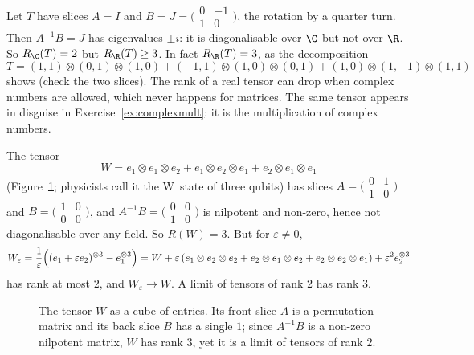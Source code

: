 \begin{example}\label{exa:rotation}
Let $T$ have slices $A=I$ and $B=J=\bigl(\begin{smallmatrix}0&-1\\1&0\end{smallmatrix}\bigr)$, the rotation by a quarter turn. Then
$A^{-1}B=J$ has eigenvalues $\pm i$: it is diagonalisable over $\C$ but not over $\R$. So $R_\C(T)=2$ but $R_\R(T)\ge3$. In fact
$R_\R(T)=3$, as the decomposition
\[
T=(1,1)\otimes(0,1)\otimes(1,0)+(-1,1)\otimes(1,0)\otimes(0,1)+(1,0)\otimes(1,-1)\otimes(1,1)
\]
shows (check the two slices). The rank of a real tensor can drop when complex numbers are allowed, which never happens for
matrices. The same tensor appears in disguise in Exercise~\ref{ex:complexmult}: it is the multiplication of complex numbers.
\end{example}

\begin{example}\label{exa:wtensor}
The tensor
\[
W=e_1\otimes e_1\otimes e_2+e_1\otimes e_2\otimes e_1+e_2\otimes e_1\otimes e_1
\]
(Figure~\ref{fig:wtensor}; physicists call it the W~state of three qubits) has slices $A=\bigl(\begin{smallmatrix}0&1\\1&0
\end{smallmatrix}\bigr)$ and $B=\bigl(\begin{smallmatrix}1&0\\0&0\end{smallmatrix}\bigr)$, and $A^{-1}B=\bigl(\begin{smallmatrix}0&0\\1&0
\end{smallmatrix}\bigr)$ is nilpotent and non-zero, hence not diagonalisable over any field. So $R(W)=3$. But for $\varepsilon\ne0$,
\[
W_\varepsilon=\frac1\varepsilon\Bigl((e_1+\varepsilon e_2)^{\otimes3}-e_1^{\otimes3}\Bigr)=W+\varepsilon\,(e_1\otimes e_2\otimes e_2+
e_2\otimes e_1\otimes e_2+e_2\otimes e_2\otimes e_1)+\varepsilon^2e_2^{\otimes3}
\]
has rank at most $2$, and $W_\varepsilon\to W$. A limit of tensors of rank $2$ has rank $3$.
\end{example}

\begin{figure}[ht]
\centering
{}
\caption{The tensor $W$ as a cube of entries. Its front slice $A$ is a permutation matrix and its back slice $B$ has a single
$1$; since $A^{-1}B$ is a non-zero nilpotent matrix, $W$ has rank $3$, yet it is a limit of tensors of rank $2$.}
\label{fig:wtensor}
\end{figure}

